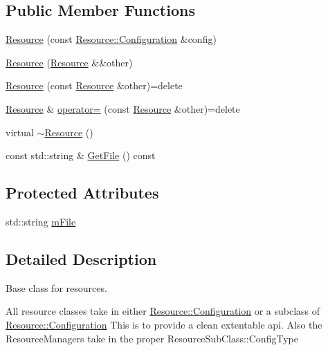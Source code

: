 \subsection*{Public Member Functions}
\begin{DoxyCompactItemize}
\item 
\hyperlink{classgl_1_1_resource_a1edca9f900b5d2851661d81317ba0076}{Resource} (const \hyperlink{classgl_1_1_resource_1_1_configuration}{Resource\-::\-Configuration} \&config)
\item 
\hyperlink{classgl_1_1_resource_a15aa46dff1cf8f0f674f444831b8a288}{Resource} (\hyperlink{classgl_1_1_resource}{Resource} \&\&other)
\item 
\hyperlink{classgl_1_1_resource_aed04a0b3ef70ec4c834b87e29d50f761}{Resource} (const \hyperlink{classgl_1_1_resource}{Resource} \&other)=delete
\item 
\hyperlink{classgl_1_1_resource}{Resource} \& \hyperlink{classgl_1_1_resource_aa5d1a0dc03ebfeb6bdd2b12a795a9fdd}{operator=} (const \hyperlink{classgl_1_1_resource}{Resource} \&other)=delete
\item 
virtual \hyperlink{classgl_1_1_resource_aaabd5bae068524556573c4f9f026c130}{$\sim$\-Resource} ()
\item 
const std\-::string \& \hyperlink{classgl_1_1_resource_a303a83798d6fad7e933fa7745c9ec18d}{Get\-File} () const 
\end{DoxyCompactItemize}
\subsection*{Protected Attributes}
\begin{DoxyCompactItemize}
\item 
std\-::string \hyperlink{classgl_1_1_resource_a1e2c1b22896c2a996f79a3a0308b8ecc}{m\-File}
\end{DoxyCompactItemize}


\subsection{Detailed Description}
Base class for resources.

All resource classes take in either \hyperlink{classgl_1_1_resource_1_1_configuration}{Resource\-::\-Configuration} or a subclass of \hyperlink{classgl_1_1_resource_1_1_configuration}{Resource\-::\-Configuration} This is to provide a clean extentable api. Also the Resource\-Managers take in the proper Resource\-Sub\-Class\-::\-Config\-Type 

